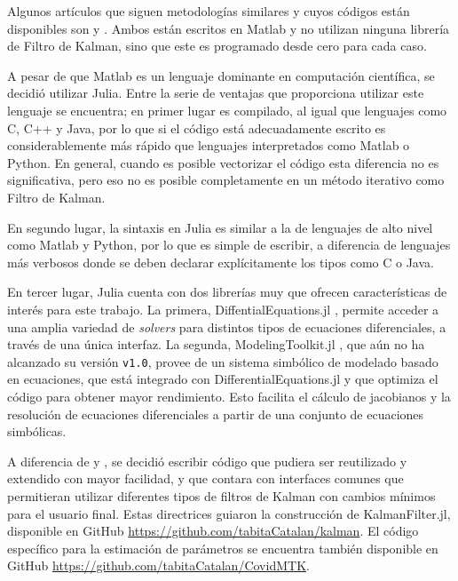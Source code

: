 Algunos artículos que siguen metodologías similares y cuyos códigos están disponibles son \cite{Hasan2020} y \cite{Sameni2020}. Ambos están escritos en Matlab y no utilizan ninguna librería de Filtro de Kalman, sino que este es programado desde cero para cada caso.

A pesar de que Matlab es un lenguaje dominante en computación científica, se decidió utilizar Julia. Entre la serie de ventajas que proporciona utilizar este lenguaje se encuentra; en primer lugar es compilado, al igual que lenguajes como C, C++ y Java, por lo que si el código está adecuadamente escrito es considerablemente más rápido que lenguajes interpretados como Matlab o Python. En general, cuando es posible vectorizar el código esta diferencia no es significativa, pero eso no es posible completamente en un método iterativo como Filtro de Kalman.

En segundo lugar, la sintaxis en Julia es similar a la de lenguajes de alto nivel como Matlab y Python, por lo que es simple de escribir, a diferencia de lenguajes más verbosos donde se deben declarar explícitamente los tipos como C o Java.

En tercer lugar, Julia cuenta con dos librerías muy que ofrecen características de interés para este trabajo. La primera, DiffentialEquations.jl \cite{Rackauckas2017}, permite acceder a una amplia variedad de \textit{solvers} para distintos tipos de ecuaciones diferenciales, a través de una única interfaz. La segunda, ModelingToolkit.jl \cite{Ma2021}, que aún no ha alcanzado su versión \texttt{v1.0}, provee de un sistema simbólico de modelado basado en ecuaciones, que está integrado con DifferentialEquations.jl y que optimiza el código para obtener mayor rendimiento. Esto facilita el cálculo de jacobianos y la resolución de ecuaciones diferenciales a partir de una conjunto de ecuaciones simbólicas.

A diferencia de \cite{Hasan2020} y \cite{Sameni2020}, se decidió escribir código que pudiera ser reutilizado y extendido con mayor facilidad, y que contara con interfaces comunes que permitieran utilizar diferentes tipos de filtros de Kalman con cambios mínimos para el usuario final. Estas directrices guiaron la construcción de KalmanFilter.jl, disponible en GitHub \url{https://github.com/tabitaCatalan/kalman}. El código específico para la estimación de parámetros se encuentra también disponible en GitHub \url{https://github.com/tabitaCatalan/CovidMTK}.

